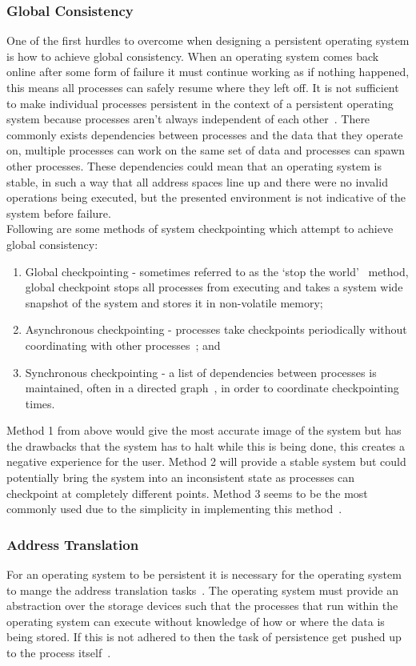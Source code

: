 \documentclass[a4paper,12pt]{article}
\begin{document}
\subsubsection{Global Consistency}
One of the first hurdles to overcome when designing a persistent operating system is how to achieve global consistency. When an operating system comes back online after some form of failure it must continue working as if nothing happened, this means all processes can safely resume where they left off. 
It is not sufficient to make individual processes persistent in the context of a persistent operating system because processes aren't always independent of each other~\citep{coexistence}. There commonly exists dependencies between processes and the data that they operate on, multiple processes can work on the same set of data and processes can spawn other processes. These dependencies could mean that an operating system is stable, in such a way that all address spaces line up and there were no invalid operations being executed, but the presented environment is not indicative of the system before failure.
\\
Following are some methods of system checkpointing which attempt to achieve global consistency:
\begin{enumerate}
    \item{Global checkpointing - sometimes referred to as the `stop the world'~\citep{grasshopperkernel} method, global checkpoint stops all processes from executing and takes a system wide snapshot of the system and stores it in non-volatile memory;}
    \item{Asynchronous checkpointing - processes take checkpoints periodically without coordinating with other processes~\citep{checkpointing}; and}
    \item{Synchronous checkpointing - a list of dependencies between processes is maintained, often in a directed graph~\citep{coexistence}, in order to coordinate checkpointing times.}
\end{enumerate}
Method 1 from above would give the most accurate image of the system but has the drawbacks that the system has to halt while this is being done, this creates a negative experience for the user. Method 2 will provide a stable system but could potentially bring the system into an inconsistent state as processes can checkpoint at completely different points. Method 3 seems to be the most commonly used due to the simplicity in implementing this method~\citep{checkpointing}.
\subsubsection{Address Translation}
For an operating system to be persistent it is necessary for the operating system to mange the address translation tasks~\citep{Dearle92anexamination}. The operating system must provide an abstraction over the storage devices such that the processes that run within the operating system can execute without knowledge of how or where the data is being stored. If this is not adhered to then the task of persistence get pushed up to the process itself~\citep{Kakkad:1998:ATS:899484}.
\end{document}

